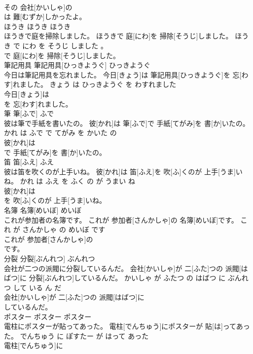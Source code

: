 \documentclass[8pt]{extreport}
\begin{document}
\begin{CJK}{UTF8}{min}
\\	その 会社[かいしゃ]の
\\	は 難[むずか]しかったよ。			
\\	ほうき	ほうき	ほうき	
\\	ほうきで庭を掃除しました。	ほうきで 庭[にわ]を 掃除[そうじ]しました。	ほうき で にわ を そうじ しました 。	
\\	で 庭[にわ]を 掃除[そうじ]しました。			
\\	筆記用具	筆記用具[ひっきようぐ]	ひっきようぐ	
\\	今日は筆記用具を忘れました。	今日[きょう]は 筆記用具[ひっきようぐ]を 忘[わす]れました。	きょう は ひっきようぐ を わすれました	
\\	今日[きょう]は
\\	を 忘[わす]れました。			
\\	筆	筆[ふで]	ふで	
\\	彼は筆で手紙を書いたの。	彼[かれ]は 筆[ふで]で 手紙[てがみ]を 書[か]いたの。	かれ は ふで で てがみ を かいた の	
\\	彼[かれ]は
\\	で 手紙[てがみ]を 書[か]いたの。			
\\	笛	笛[ふえ]	ふえ	
\\	彼は笛を吹くのが上手いね。	彼[かれ]は 笛[ふえ]を 吹[ふ]くのが 上手[うま]いね。	かれ は ふえ を ふく の が うまい ね	
\\	彼[かれ]は
\\	を 吹[ふ]くのが 上手[うま]いね。			
\\	名簿	名簿[めいぼ]	めいぼ	
\\	これが参加者の名簿です。	これが 参加者[さんかしゃ]の 名簿[めいぼ]です。	これ が さんかしゃ の めいぼ です	
\\	これが 参加者[さんかしゃ]の
\\	です。			
\\	分裂	分裂[ぶんれつ]	ぶんれつ	
\\	会社が二つの派閥に分裂しているんだ。	会社[かいしゃ]が 二[ふた]つの 派閥[はばつ]に 分裂[ぶんれつ]しているんだ。	かいしゃ が ふたつ の はばつ に ぶんれつ して いる ん だ	
\\	会社[かいしゃ]が 二[ふた]つの 派閥[はばつ]に
\\	しているんだ。			
\\	ポスター	ポスター	ポスター	
\\	電柱にポスターが貼ってあった。	電柱[でんちゅう]にポスターが 貼[は]ってあった。	でんちゅう に ぽすたー が はって あった	
\\	電柱[でんちゅう]に

\end{CJK}
\end{document}

